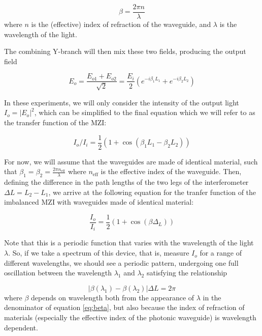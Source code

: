 \documentclass[journal]{IEEEtran}
\begin{document}
\begin{equation}
\beta = \frac{2\pi n}{\lambda}
\label{eq:beta}
\end{equation}
where $n$ is the (effective) index of refraction of the waveguide, and $\lambda$ is the wavelength of the light.

The combining Y-branch will then mix these two fields, producing the output field 

\begin{equation}
E_o = \frac{E_{o1} + E_{o2}}{\sqrt{2}} = \frac{E_i}{2} \left(e^{-i \beta_1 L_1} + e^{-i \beta_2 L_2} \right)
\end{equation}

In these experiments, we will only consider the intensity of the output light $I_o = |E_o|^2$, which can be simplified to the final equation which we will refer to as the transfer function of the MZI:

\begin{equation}
I_o/I_i = \frac{1}{2} (1 + \cos{(\beta_1 L_1 - \beta_2 L_2)})
\label{eq:trans_full}
\end{equation}

For now, we will assume that the waveguides are made of identical material, such that $\beta_1 = \beta_2 = \frac{2 \pi n_{\text{eff}}}{\lambda}$ where $n_{\text{eff}}$ is the effective index of the waveguide. Then, defining the difference in the path lengths of the two legs of the interferometer $\Delta L = L_2 - L_1$, we arrive at the following equation for the tranfer function of the imbalanced MZI with waveguides made of identical material:

\begin{equation}
\frac{I_o}{I_i} = \frac{1}{2} \left(1 + \cos{(\beta \Delta_L)}\right)
\end{equation}

Note that this is a periodic function that varies with the wavelength of the light $\lambda$. So, if we take a spectrum of this device, that is, measure $I_o$ for a range of different wavelengths, we should see a periodic pattern, undergoing one full oscillation between the wavelength $\lambda_1$ and $\lambda_2$ satisfying the relationship 

\begin{equation}
|\beta(\lambda_1) - \beta(\lambda_2)| \Delta L = 2 \pi
\label{eq:FSR_cond}
\end{equation}
where $\beta$ depends on wavelength both from the appearance of $\lambda$ in the denominator of equation \ref{eq:beta}, but also because the index of refraction of materials (especially the effective index of the photonic waveguide) is wavelength dependent.  
\end{document}
